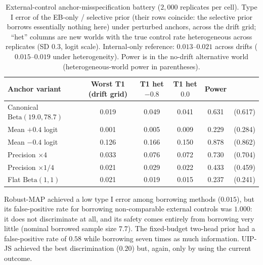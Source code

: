\documentclass[11pt]{article}
\begin{document}
\begin{table}[htbp]
\centering
\small
\caption{External-control anchor-misspecification battery ($2{,}000$
replicates per cell). Type I error of the EB-only / selective prior (their
rows coincide: the selective prior borrows essentially nothing here) under
perturbed anchors, across the drift grid; ``het'' columns are new worlds
with the true control rate heterogeneous across replicates (SD $0.3$,
logit scale). Internal-only reference: $0.013$--$0.021$ across drifts
($0.015$--$0.019$ under heterogeneity). Power is in the no-drift
alternative world (heterogeneous-world power in parentheses).}
\label{tab:ec-anchor}
\begin{tabular}{lccccc}
\hline
Anchor variant & Worst T1 (drift grid) & T1 het $-0.8$ & T1 het $0.0$ & Power & \\
\hline
Canonical $\mathrm{Beta}(19.0,78.7)$ & 0.019 & 0.049 & 0.041 & 0.631 & (0.617) \\
Mean $+0.4$ logit                    & 0.001 & 0.005 & 0.009 & 0.229 & (0.284) \\
Mean $-0.4$ logit                    & 0.126 & 0.166 & 0.150 & 0.878 & (0.862) \\
Precision $\times 4$                 & 0.033 & 0.076 & 0.072 & 0.730 & (0.704) \\
Precision $\times 1/4$               & 0.021 & 0.029 & 0.022 & 0.433 & (0.459) \\
Flat $\mathrm{Beta}(1,1)$            & 0.021 & 0.019 & 0.015 & 0.237 & (0.241) \\
\hline
\end{tabular}
\end{table}

Robust-MAP achieved a low type I error among borrowing methods ($0.015$),
but its false-positive rate for borrowing non-comparable external controls was
$1.000$: it does not discriminate at all, and its safety comes entirely from
borrowing very little (nominal borrowed sample size $7.7$). The fixed-budget
two-head prior had a
false-positive rate of $0.58$ while borrowing seven times as much information.
UIP-JS achieved the best discrimination ($0.20$) but, again, only by using the
current outcome.
\end{document}
